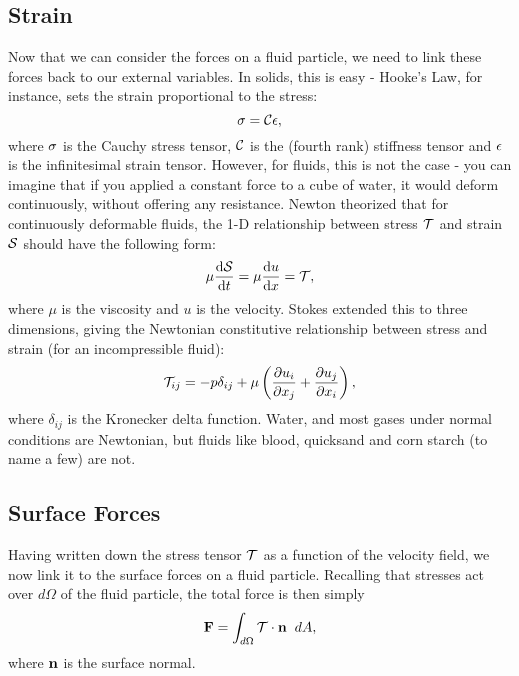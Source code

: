 \subsection{Strain}
Now that we can consider the forces on a fluid particle, we need to link these forces back to our external variables. In solids, this is easy - Hooke's Law, for instance, sets the strain proportional to the stress:
\begin{equation}
\mathbf{\sigma} = \mathcal{C}\mathbf{\epsilon},
\end{equation}
where $\mathbf{\sigma}$ is the Cauchy stress tensor, $\mathcal{C}$ is the (fourth rank) stiffness tensor and $\mathbf{\epsilon}$ is the infinitesimal strain tensor. However, for fluids, this is not the case - you can imagine that if you applied a constant force to a cube of water, it would deform continuously, without offering any resistance. Newton theorized that for continuously deformable fluids, the 1-D relationship between stress $\mathcal{T}$ and strain $\mathcal{S}$ should have the following form:
\begin{equation}
\mu \der{1}{\Tensor{S}}{t} = \mu \der{1}{u}{x}=\Tensor{T}, 
\end{equation}
where $\mu$ is the viscosity and $u$ is the velocity.  Stokes extended this to three dimensions, giving the Newtonian constitutive relationship between stress and strain (for an incompressible fluid):
\begin{equation}\label{eq:constitutive}
\Tensor{T}_{ij} = -p\delta_{ij} + \mu\paren{\pder{1}{u_{i}}{x_j} + \pder{1}{u_j}{x_i}},
\end{equation}
where $\delta_{ij}$ is the Kronecker delta function. Water, and most gases under normal conditions are Newtonian, but fluids like blood, quicksand and corn starch (to name a few) are not. 

\subsection{Surface Forces}
Having written down the stress tensor $\mathcal{T}$ as a function of the velocity field, we now link it to the surface forces on a fluid particle. Recalling that stresses act over $d\Omega$ of the fluid particle, the total force is then simply 
\begin{equation}\label{eq:surfaceForce}
\Vector{F} = \int{d\Omega}{}{\Tensor{T}\cdot\Vector{n}}{dA},
\end{equation}
where $\mathbf{n}$ is the surface normal. 
